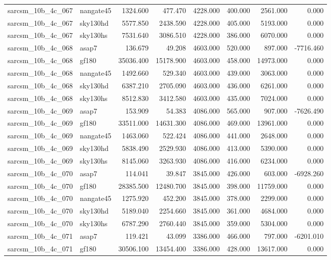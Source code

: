 \begin{tabular}{llrrrrrr}
sarcsm\_10b\_4c\_067 & nangate45 & 1324.600 & 477.470 & 4228.000 & 400.000 & 2561.000 & 0.000 \\
sarcsm\_10b\_4c\_067 & sky130hd & 5577.850 & 2438.590 & 4228.000 & 405.000 & 5193.000 & 0.000 \\
sarcsm\_10b\_4c\_067 & sky130hs & 7531.640 & 3086.510 & 4228.000 & 386.000 & 6070.000 & 0.000 \\
sarcsm\_10b\_4c\_068 & asap7 & 136.679 & 49.208 & 4603.000 & 520.000 & 897.000 & -7716.460 \\
sarcsm\_10b\_4c\_068 & gf180 & 35036.400 & 15178.900 & 4603.000 & 458.000 & 14973.000 & 0.000 \\
sarcsm\_10b\_4c\_068 & nangate45 & 1492.660 & 529.340 & 4603.000 & 439.000 & 3063.000 & 0.000 \\
sarcsm\_10b\_4c\_068 & sky130hd & 6387.210 & 2705.090 & 4603.000 & 436.000 & 6261.000 & 0.000 \\
sarcsm\_10b\_4c\_068 & sky130hs & 8512.830 & 3412.580 & 4603.000 & 435.000 & 7024.000 & 0.000 \\
sarcsm\_10b\_4c\_069 & asap7 & 153.909 & 54.383 & 4086.000 & 565.000 & 907.000 & -7626.490 \\
sarcsm\_10b\_4c\_069 & gf180 & 33511.000 & 14631.300 & 4086.000 & 469.000 & 13961.000 & 0.000 \\
sarcsm\_10b\_4c\_069 & nangate45 & 1463.060 & 522.424 & 4086.000 & 441.000 & 2648.000 & 0.000 \\
sarcsm\_10b\_4c\_069 & sky130hd & 5838.490 & 2529.930 & 4086.000 & 413.000 & 5390.000 & 0.000 \\
sarcsm\_10b\_4c\_069 & sky130hs & 8145.060 & 3263.930 & 4086.000 & 416.000 & 6234.000 & 0.000 \\
sarcsm\_10b\_4c\_070 & asap7 & 114.041 & 39.847 & 3845.000 & 426.000 & 603.000 & -6928.260 \\
sarcsm\_10b\_4c\_070 & gf180 & 28385.500 & 12480.700 & 3845.000 & 398.000 & 11759.000 & 0.000 \\
sarcsm\_10b\_4c\_070 & nangate45 & 1275.920 & 452.200 & 3845.000 & 378.000 & 2299.000 & 0.000 \\
sarcsm\_10b\_4c\_070 & sky130hd & 5189.040 & 2254.660 & 3845.000 & 361.000 & 4684.000 & 0.000 \\
sarcsm\_10b\_4c\_070 & sky130hs & 6787.290 & 2760.440 & 3845.000 & 359.000 & 5304.000 & 0.000 \\
sarcsm\_10b\_4c\_071 & asap7 & 119.421 & 43.099 & 3386.000 & 466.000 & 797.000 & -6201.010 \\
sarcsm\_10b\_4c\_071 & gf180 & 30506.100 & 13454.400 & 3386.000 & 428.000 & 13617.000 & 0.000 \\

\end{tabular}
